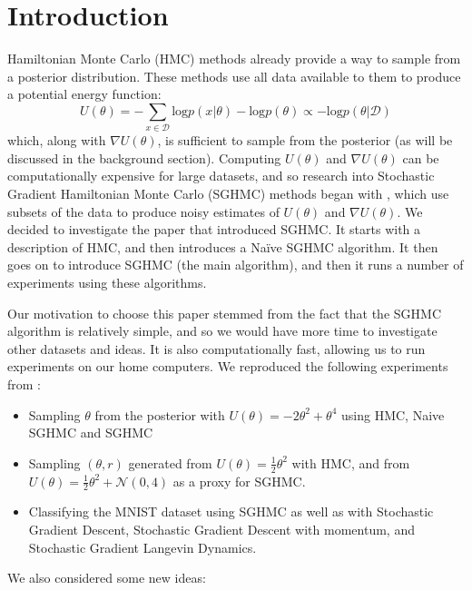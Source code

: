 
\section{Introduction}

Hamiltonian Monte Carlo (HMC) methods already provide a way to sample from a posterior distribution. These methods use all data available to them to produce a potential energy function:
\begin{equation*}
    U(\theta) = - \sum_{x\in\mathcal{D}}\text{log}p(x| \theta) - \text{log}p(\theta ) \propto -\text{log}p(\theta | \mathcal{D})
\end{equation*}
which, along with $\nabla U(\theta)$, is sufficient to sample from the posterior (as will be discussed in the background section). Computing $U(\theta)$ and $\nabla U(\theta)$ can be computationally expensive for large datasets, and so research into Stochastic Gradient Hamiltonian Monte Carlo (SGHMC) methods began with \cite{sghmc}, which use subsets of the data to produce noisy estimates of $U(\theta)$ and $\nabla U(\theta)$. We decided to investigate the paper that introduced SGHMC. It starts with a description of HMC, and then introduces a Naïve SGHMC algorithm. It then goes on to introduce SGHMC (the main algorithm), and then it runs a number of experiments using these algorithms.

Our motivation to choose this paper stemmed from the fact that the SGHMC algorithm is relatively simple, and so we would have more time to investigate other datasets and ideas. It is also computationally fast, allowing us to run experiments on our home computers. We reproduced the following experiments from \cite{sghmc}:

\begin{itemize}
    \item Sampling $\theta$ from the posterior with $U(\theta) = -2\theta^2 + \theta^4$ using HMC, Naive SGHMC and SGHMC
    \item Sampling $(\theta,r)$ generated from $U(\theta) = \frac{1}{2}\theta^2$ with HMC, and from $U(\theta) = \frac{1}{2}\theta^2 + \mathcal{N}(0,4)$ as a proxy for SGHMC.
    \item Classifying the MNIST dataset \cite{mnist} using SGHMC as well as with Stochastic Gradient Descent, Stochastic Gradient Descent with momentum, and Stochastic Gradient Langevin Dynamics.
\end{itemize}

We also considered some new ideas:

